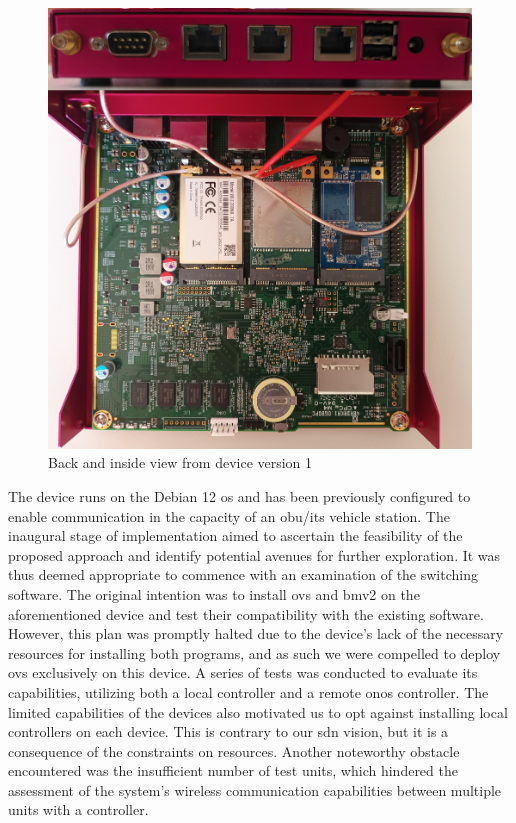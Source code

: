 \begin{figure}
	\centering
	\includegraphics[width=\textwidth]{Chapters/Figures/Implementation/devices/device_1.jpg}
	\caption{Back and inside view from device version 1}
	\label{fig:device_1}
\end{figure}

The device runs on the Debian 12 \gls{os} and has been previously configured to enable communication in the capacity of an \gls{obu}/\gls{its} vehicle station.
The inaugural stage of implementation aimed to ascertain the feasibility of the proposed approach and identify potential avenues for further exploration. It was thus deemed appropriate to commence with an examination of the switching software. The original intention was to install \gls{ovs} and \gls{bmv2} on the aforementioned device and test their compatibility with the existing software. However, this plan was promptly halted due to the device's lack of the necessary resources for installing both programs, and as such we were compelled to deploy \gls{ovs} exclusively on this device. 
A series of tests was conducted to evaluate its capabilities, utilizing both a local controller and a remote \gls{onos} controller. The limited capabilities of the devices also motivated us to opt against installing local controllers on each device. This is contrary to our \gls{sdn} vision, but it is a consequence of the constraints on resources. Another noteworthy obstacle encountered was the insufficient number of test units, which hindered the assessment of the system's wireless communication capabilities between multiple units with a controller.


